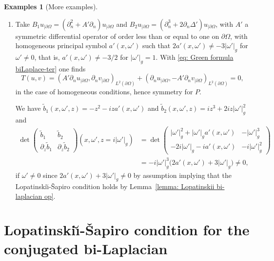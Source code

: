 \documentclass[10pt]{amsart}
\theoremstyle{plain}
\theoremstyle{definition}
\newtheorem{examples}[theorem]{Examples}
\newcommand{\LS}{Lopatinski\u{\i}-\v{S}apiro\xspace}
\newcommand{\inp}[2]{(#1, #2)}
\newcommand{\bd}{\ensuremath{_{|\partial\Omega}}}
\begin{document}
\begin{examples}[More examples]
\begin{enumerate}
\item Take $B_1 u\bd = (\partial_n^2 + A' \partial_n) u\bd$ and $B_2 u\bd
= (\partial_n^3+ 2 \partial_n\Delta') u\bd$, with $A'$ a symmetric differential
operator of order less than or equal to one on
$\partial \Omega$, with homogeneous principal symbol $a'(x,\omega')$ such that
$2 a'(x,\omega') \neq - 3 |\omega'|_g $ for $\omega' \neq 0$, that
is, $a'(x,\omega')\neq -3/2$ for $|\omega'|_g=1$.
With \eqref{eq: Green formula biLaplace-ter} one
finds
\begin{equation*}
T(u,v)
= \inp{A' \partial_n u\bd}{\partial_n v\bd}_{L^2(\partial\Omega)}
+ \inp{\partial_n u\bd}{- A' \partial_n v\bd}_{L^2(\partial\Omega)}
=0,
\end{equation*}
in the case of homogeneous conditions, hence symmetry for $P$.

We have $\tilde{b}_1(x,\omega',z)=-z^2 -i z a'(x,\omega')$ and
$\tilde{b}_2(x,\omega',z)=iz^3 + 2 i z |\omega'|_g^2$ and
\begin{align*}
\det
\begin{pmatrix}
\tilde{b}_1 &\tilde{b}_2 \\[
2pt]
\partial_z\tilde{b}_1& \partial_z\tilde{b}_2
\end{pmatrix} (x,\omega',z=i|\omega'|_g)
& =
\det
\begin{pmatrix}
|\omega'|^2_g + |\omega'|_g a'(x,\omega')&-|\omega'|^3_g \\[
2pt]
-2i|\omega'|_g - i a'(x,\omega')&-i|\omega'|^2_g
\end{pmatrix} \\
& =- i |\omega'|^3_g \big(2 a'(x,\omega') + 3 |\omega'|_g\big) \neq 0,
\end{align*}
if $\omega'\neq 0$ since $2 a'(x,\omega') + 3 |\omega'|_g \neq 0$ by
assumption implying that the \LS condition holds by Lemma~\ref{lemma: Lopatinskii bi-laplacian op}.
\end{enumerate}
\end{examples}

\section{Lopatinski\u{\i}-\v{S}apiro condition for the conjugated
bi-Laplacian}
\label{sec: LS condition for conjugated bilaplace}
\end{document}
